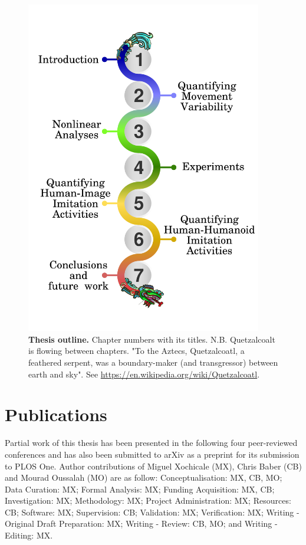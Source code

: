 \begin{figure}
\centering
\includegraphics[width=0.92\textwidth]{toutline}
    \caption[Thesis outline]{
	{\bf Thesis outline.}
	Chapter numbers with its titles. 
	N.B. Quetzalcoalt is flowing between chapters.
	"To the Aztecs, Quetzalcoatl,  
	a feathered serpent, was a boundary-maker (and transgressor) 
	between earth and sky". See 
	\url{https://en.wikipedia.org/wiki/Quetzalcoatl}.
	}
    \label{fig:thesis-outline}
\end{figure}

\newpage
\section{Publications}
Partial work of this thesis has been presented in the following four 
peer-reviewed conferences and has also been submitted to arXiv as a 
preprint for its submission to PLOS One. 
Author contributions of 
Miguel Xochicale (MX), Chris Baber (CB) and Mourad Oussalah (MO) are as follow:
Conceptualisation: MX, CB, MO;
Data Curation: MX;
Formal Analysis: MX;
Funding Acquisition: MX, CB;
Investigation: MX;
Methodology: MX;
Project Administration: MX;
Resources: CB;
Software: MX;
Supervision: CB;
Validation: MX;
Verification: MX;
Writing - Original Draft Preparation: MX;
Writing - Review: CB, MO; and 
Writing - Editing: MX.


